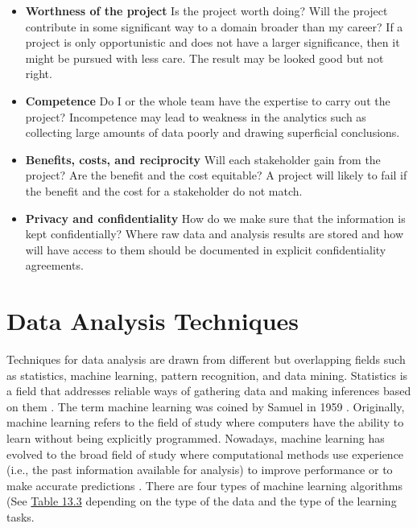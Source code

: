 \documentclass[]{book}
\theoremstyle{definition}
\theoremstyle{definition}
\theoremstyle{definition}
\theoremstyle{remark}
\begin{document}
\begin{itemize}
\item
  \textbf{Worthness of the project} Is the project worth doing? Will the
  project contribute in some significant way to a domain broader than my
  career? If a project is only opportunistic and does not have a larger
  significance, then it might be pursued with less care. The result may
  be looked good but not right.
\item
  \textbf{Competence} Do I or the whole team have the expertise to carry
  out the project? Incompetence may lead to weakness in the analytics
  such as collecting large amounts of data poorly and drawing
  superficial conclusions.
\item
  \textbf{Benefits, costs, and reciprocity} Will each stakeholder gain
  from the project? Are the benefit and the cost equitable? A project
  will likely to fail if the benefit and the cost for a stakeholder do
  not match.
\item
  \textbf{Privacy and confidentiality} How do we make sure that the
  information is kept confidentially? Where raw data and analysis
  results are stored and how will have access to them should be
  documented in explicit confidentiality agreements.
\end{itemize}

\section{Data Analysis Techniques}\label{data-analysis-techniques}

Techniques for data analysis are drawn from different but overlapping
fields such as statistics, machine learning, pattern recognition, and
data mining. Statistics is a field that addresses reliable ways of
gathering data and making inferences based on them
\citep{bandyo2011, bluman2012}. The term machine learning was coined by
Samuel in 1959 \citep{samuel1959ml}. Originally, machine learning refers
to the field of study where computers have the ability to learn without
being explicitly programmed. Nowadays, machine learning has evolved to
the broad field of study where computational methods use experience
(i.e., the past information available for analysis) to improve
performance or to make accurate predictions
\citep{bishop2007, clarke2009, mohri2012, kubat2017}. There are four
types of machine learning algorithms (See
\protect\hyperlink{tab:13.3}{Table 13.3} depending on the type of the
data and the type of the learning tasks.
\end{document}
